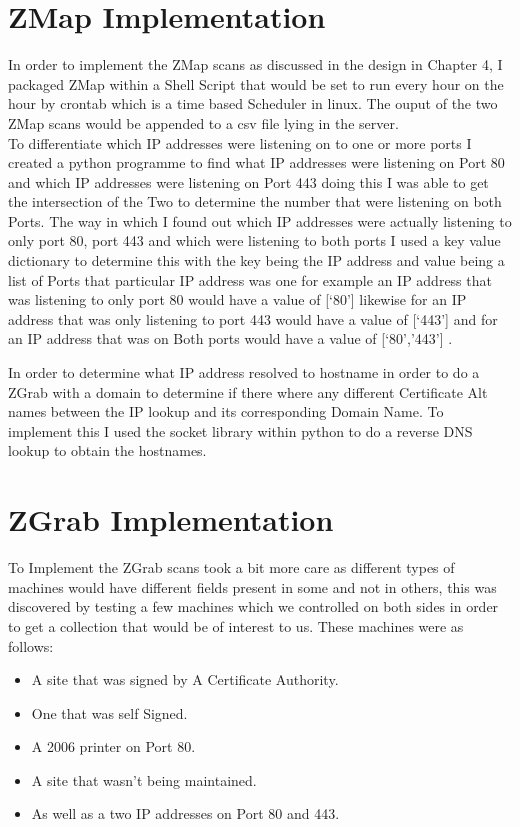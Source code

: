 \documentclass[a4wide,leqno,12pt]{report}
\begin{document}
\section{ZMap Implementation}
In order to implement the ZMap scans as discussed in the design in Chapter 4, I packaged ZMap within a Shell Script that would be set to run every hour on the hour by crontab which is a time based Scheduler in linux. The ouput of the two ZMap scans would be appended to a csv file lying in the server.\\

To differentiate which IP addresses were listening on to one or more ports I created a python programme to find what IP addresses were listening on Port 80 and which IP addresses were listening on Port 443 doing this I was able to get the intersection of the Two to determine the number that were listening on both Ports. The way in which I found out which IP addresses were actually listening to only port 80, port 443 and which were listening to both ports I used a key value dictionary to determine this with the key being the IP address and value being a list of Ports that particular IP address was one for example an IP address that was listening to only port 80 would have a value of [‘80’] likewise for an IP address that was only listening to port 443 would have a value of [‘443’] and for an IP address that was on Both ports would have a value of [‘80’,’443’] .

In order to determine what IP address resolved to hostname in order to do a ZGrab with a domain to determine if there where any different Certificate Alt names between the IP lookup and its corresponding Domain Name. To implement this I used the socket library within python to do a reverse DNS lookup to obtain the hostnames.\\


\section{ZGrab Implementation}

To Implement the ZGrab scans took a bit more care as different types of machines would have different fields present in some and not in others, this was discovered by testing a few machines which we controlled on both sides in order to get a collection that would be of interest to us. These machines were as follows:

\begin{itemize}
  \item A site that was signed by A Certificate Authority.
  \item One that was self Signed.
  \item A 2006 printer on Port 80.
  \item A site that wasn't being maintained.
  \item As well as a two IP addresses on Port 80 and 443.
 
\end{itemize}
\end{document}
